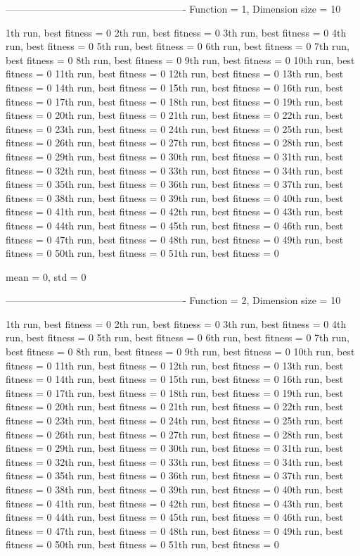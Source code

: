 
-------------------------------------------------------
Function = 1, Dimension size = 10

1th run, best fitness = 0
2th run, best fitness = 0
3th run, best fitness = 0
4th run, best fitness = 0
5th run, best fitness = 0
6th run, best fitness = 0
7th run, best fitness = 0
8th run, best fitness = 0
9th run, best fitness = 0
10th run, best fitness = 0
11th run, best fitness = 0
12th run, best fitness = 0
13th run, best fitness = 0
14th run, best fitness = 0
15th run, best fitness = 0
16th run, best fitness = 0
17th run, best fitness = 0
18th run, best fitness = 0
19th run, best fitness = 0
20th run, best fitness = 0
21th run, best fitness = 0
22th run, best fitness = 0
23th run, best fitness = 0
24th run, best fitness = 0
25th run, best fitness = 0
26th run, best fitness = 0
27th run, best fitness = 0
28th run, best fitness = 0
29th run, best fitness = 0
30th run, best fitness = 0
31th run, best fitness = 0
32th run, best fitness = 0
33th run, best fitness = 0
34th run, best fitness = 0
35th run, best fitness = 0
36th run, best fitness = 0
37th run, best fitness = 0
38th run, best fitness = 0
39th run, best fitness = 0
40th run, best fitness = 0
41th run, best fitness = 0
42th run, best fitness = 0
43th run, best fitness = 0
44th run, best fitness = 0
45th run, best fitness = 0
46th run, best fitness = 0
47th run, best fitness = 0
48th run, best fitness = 0
49th run, best fitness = 0
50th run, best fitness = 0
51th run, best fitness = 0

mean = 0, std = 0

-------------------------------------------------------
Function = 2, Dimension size = 10

1th run, best fitness = 0
2th run, best fitness = 0
3th run, best fitness = 0
4th run, best fitness = 0
5th run, best fitness = 0
6th run, best fitness = 0
7th run, best fitness = 0
8th run, best fitness = 0
9th run, best fitness = 0
10th run, best fitness = 0
11th run, best fitness = 0
12th run, best fitness = 0
13th run, best fitness = 0
14th run, best fitness = 0
15th run, best fitness = 0
16th run, best fitness = 0
17th run, best fitness = 0
18th run, best fitness = 0
19th run, best fitness = 0
20th run, best fitness = 0
21th run, best fitness = 0
22th run, best fitness = 0
23th run, best fitness = 0
24th run, best fitness = 0
25th run, best fitness = 0
26th run, best fitness = 0
27th run, best fitness = 0
28th run, best fitness = 0
29th run, best fitness = 0
30th run, best fitness = 0
31th run, best fitness = 0
32th run, best fitness = 0
33th run, best fitness = 0
34th run, best fitness = 0
35th run, best fitness = 0
36th run, best fitness = 0
37th run, best fitness = 0
38th run, best fitness = 0
39th run, best fitness = 0
40th run, best fitness = 0
41th run, best fitness = 0
42th run, best fitness = 0
43th run, best fitness = 0
44th run, best fitness = 0
45th run, best fitness = 0
46th run, best fitness = 0
47th run, best fitness = 0
48th run, best fitness = 0
49th run, best fitness = 0
50th run, best fitness = 0
51th run, best fitness = 0


